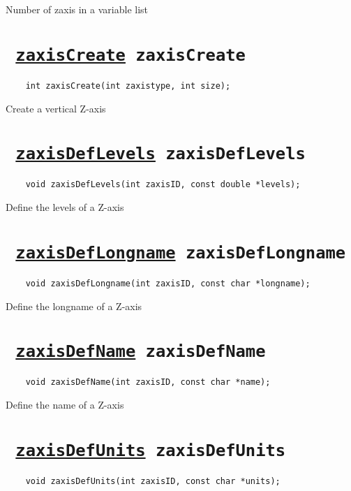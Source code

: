 Number of zaxis in a variable list
\ifpdfoutput{}{(\ref{vlistNzaxis})}


\section*{\tt 
\ifpdf
\hyperref[zaxisCreate]{zaxisCreate}
\else
zaxisCreate
\fi
}
\begin{verbatim}
    int zaxisCreate(int zaxistype, int size);
\end{verbatim}

Create a vertical Z-axis
\ifpdfoutput{}{(\ref{zaxisCreate})}


\section*{\tt 
\ifpdf
\hyperref[zaxisDefLevels]{zaxisDefLevels}
\else
zaxisDefLevels
\fi
}
\begin{verbatim}
    void zaxisDefLevels(int zaxisID, const double *levels);
\end{verbatim}

Define the levels of a Z-axis
\ifpdfoutput{}{(\ref{zaxisDefLevels})}


\section*{\tt 
\ifpdf
\hyperref[zaxisDefLongname]{zaxisDefLongname}
\else
zaxisDefLongname
\fi
}
\begin{verbatim}
    void zaxisDefLongname(int zaxisID, const char *longname);
\end{verbatim}

Define the longname of a Z-axis
\ifpdfoutput{}{(\ref{zaxisDefLongname})}


\section*{\tt 
\ifpdf
\hyperref[zaxisDefName]{zaxisDefName}
\else
zaxisDefName
\fi
}
\begin{verbatim}
    void zaxisDefName(int zaxisID, const char *name);
\end{verbatim}

Define the name of a Z-axis
\ifpdfoutput{}{(\ref{zaxisDefName})}


\section*{\tt 
\ifpdf
\hyperref[zaxisDefUnits]{zaxisDefUnits}
\else
zaxisDefUnits
\fi
}
\begin{verbatim}
    void zaxisDefUnits(int zaxisID, const char *units);
\end{verbatim}

